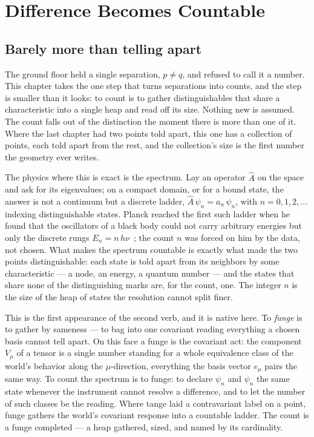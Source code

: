 \chapter{Difference Becomes Countable}

\section{Barely more than telling apart}

The ground floor held a single separation, $p \neq q$, and refused to call it a number. This chapter takes the one step that
turns separations into counts, and the step is smaller than it looks: to count is to gather distinguishables that share a
characteristic into a single heap and read off its size. Nothing new is assumed. The count falls out of the distinction the
moment there is more than one of it. Where the last chapter had two points told apart, this one has a collection of points,
each told apart from the rest, and the collection's size is the first number the geometry ever writes.

The physics where this is exact is the spectrum. Lay an operator $\hat{A}$ on the space and ask for its eigenvalues; on a
compact domain, or for a bound state, the answer is not a continuum but a discrete ladder, $\hat{A}\,\psi_n = a_n\,\psi_n$,
with $n = 0, 1, 2, \dots$ indexing distinguishable states. Planck reached the first such ladder when he found that the
oscillators of a black body could not carry arbitrary energies but only the discrete rungs $E_n = n\,h\nu$~\cite{planck1901,
planck1900}; the count $n$ was forced on him by the data, not chosen. What makes the spectrum countable is exactly what made
the two points distinguishable: each state is told apart from its neighbors by some characteristic --- a node, an energy, a
quantum number --- and the states that share none of the distinguishing marks are, for the count, one. The integer $n$ is
the size of the heap of states the resolution cannot split finer.

This is the first appearance of the second verb, and it is native here. To \emph{funge} is to gather by sameness --- to bag
into one covariant reading everything a chosen basis cannot tell apart. On this face a funge is the covariant act: the
component $V_\mu$ of a tensor is a single number standing for a whole equivalence class of the world's behavior along the
$\mu$-direction, everything the basis vector $e_\mu$ pairs the same way. To count the spectrum is to funge: to declare
$\psi_n$ and $\psi_{n}$ the same state whenever the instrument cannot resolve a difference, and to let the number of such
classes be the reading. Where tange laid a contravariant label on a point, funge gathers the world's covariant response into
a countable ladder. The count is a funge completed --- a heap gathered, sized, and named by its cardinality.

